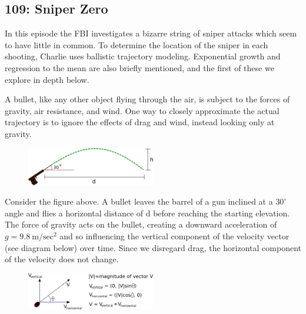 \newpage
\subsection{109: Sniper Zero\label{109}}

In this episode the FBI investigates a bizarre string of sniper attacks which seem to have little in common. To determine the location of the sniper in each shooting, Charlie uses ballistic trajectory modeling. Exponential growth and regression to the mean are also briefly mentioned, and the first of these we explore in depth below. \\


A bullet, like any other object flying through the air, is subject to the forces of gravity, air resistance, and wind. One way to closely approximate the actual trajectory is to ignore the effects of drag and wind, instead looking only at gravity. \\

	\begin{figure}[H] 
	   \centering
	   \includegraphics[width=0.5\textwidth]{season1/109/images/109(1).png} 
	\end{figure}
	
Consider the figure above. A bullet leaves the barrel of a gun inclined at a $30^\circ$ angle and flies a horizontal distance of d before reaching the starting elevation. The force of gravity acts on the bullet, creating a downward acceleration of $g=9.8~\text{m}/\text{sec}^2$ and so influencing the vertical component of the velocity vector (see diagram below) over time. Since we disregard drag, the horizontal component of the velocity does not change. \\

	\begin{figure}[H] 
	   \centering
	   \includegraphics[width=0.5\textwidth]{season1/109/images/109(2).png} 
	\end{figure}

